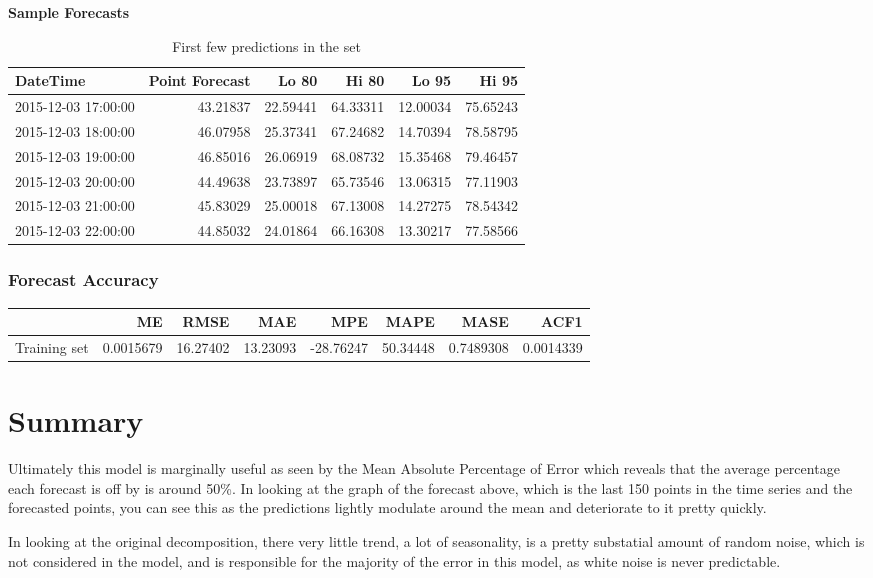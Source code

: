 \documentclass[openany]{book}
\begin{document}
\textbf{Sample Forecasts}

\begin{table}[t]

\caption{\label{tab:unnamed-chunk-15}First few predictions in the set}
\centering
\begin{tabular}{l|r|r|r|r|r}
\hline
DateTime & Point Forecast & Lo 80 & Hi 80 & Lo 95 & Hi 95\\
\hline
2015-12-03 17:00:00 & 43.21837 & 22.59441 & 64.33311 & 12.00034 & 75.65243\\
\hline
2015-12-03 18:00:00 & 46.07958 & 25.37341 & 67.24682 & 14.70394 & 78.58795\\
\hline
2015-12-03 19:00:00 & 46.85016 & 26.06919 & 68.08732 & 15.35468 & 79.46457\\
\hline
2015-12-03 20:00:00 & 44.49638 & 23.73897 & 65.73546 & 13.06315 & 77.11903\\
\hline
2015-12-03 21:00:00 & 45.83029 & 25.00018 & 67.13008 & 14.27275 & 78.54342\\
\hline
2015-12-03 22:00:00 & 44.85032 & 24.01864 & 66.16308 & 13.30217 & 77.58566\\
\hline
\end{tabular}
\end{table}

\hypertarget{forecast-accuracy}{%
\subsubsection{Forecast Accuracy}\label{forecast-accuracy}}

\begin{tabular}{l|r|r|r|r|r|r|r}
\hline
  & ME & RMSE & MAE & MPE & MAPE & MASE & ACF1\\
\hline
Training set & 0.0015679 & 16.27402 & 13.23093 & -28.76247 & 50.34448 & 0.7489308 & 0.0014339\\
\hline
\end{tabular}

\hypertarget{summary}{%
\section{Summary}\label{summary}}

Ultimately this model is marginally useful as seen by the Mean Absolute
Percentage of Error which reveals that the average percentage each
forecast is off by is around 50\%. In looking at the graph of the
forecast above, which is the last 150 points in the time series and the
forecasted points, you can see this as the predictions lightly modulate
around the mean and deteriorate to it pretty quickly.

In looking at the original decomposition, there very little trend, a lot
of seasonality, is a pretty substatial amount of random noise, which is
not considered in the model, and is responsible for the majority of the
error in this model, as white noise is never predictable.
\end{document}
